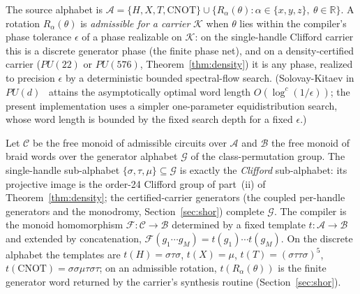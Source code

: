 \begin{definition}
\label{def:alphabet}
The source alphabet is $\mathcal{A} = \{H, X, T, \mathrm{CNOT}\} \cup \{R_\alpha(\theta) : \alpha \in \{x,y,z\},\ \theta \in \mathbb{R}\}$. A rotation $R_\alpha(\theta)$ is \emph{admissible for a carrier} $\mathcal{K}$ when $\theta$ lies within the compiler's phase tolerance $\epsilon$ of a phase realizable on $\mathcal{K}$: on the single-handle Clifford carrier this is a discrete generator phase (the finite phase net), and on a density-certified carrier ($PU(22)$ or $PU(576)$, Theorem~\ref{thm:density}) it is any phase, realized to precision $\epsilon$ by a deterministic bounded spectral-flow search. (Solovay-Kitaev in $PU(d)$~\cite{dawson2005} attains the asymptotically optimal word length $O(\log^{c}(1/\epsilon))$; the present implementation uses a simpler one-parameter equidistribution search, whose word length is bounded by the fixed search depth for a fixed $\epsilon$.)
\end{definition}

\begin{definition}
\label{def:functor}
Let $\mathcal{C}$ be the free monoid of admissible circuits over $\mathcal{A}$ and $\mathcal{B}$ the free monoid of braid words over the generator alphabet $\mathcal{G}$ of the class-permutation group. The single-handle sub-alphabet $\{\sigma,\tau,\mu\}\subseteq\mathcal{G}$ is exactly the \emph{Clifford} sub-alphabet: its projective image is the order-24 Clifford group of part~(ii) of Theorem~\ref{thm:density}; the certified-carrier generators (the coupled per-handle generators and the monodromy, Section~\ref{sec:shor}) complete $\mathcal{G}$. The compiler is the monoid homomorphism $\mathcal{F}:\mathcal{C}\to\mathcal{B}$ determined by a fixed template $t:\mathcal{A}\to\mathcal{B}$ and extended by concatenation, $\mathcal{F}(g_1\cdots g_M)=t(g_1)\cdots t(g_M)$. On the discrete alphabet the templates are $t(H)=\sigma\tau\sigma$, $t(X)=\mu$, $t(T)={(\sigma\tau\tau\sigma)}^{5}$, $t(\mathrm{CNOT})=\sigma\sigma\mu\tau\sigma\tau$; on an admissible rotation, $t(R_\alpha(\theta))$ is the finite generator word returned by the carrier's synthesis routine (Section~\ref{sec:shor}).
\end{definition}

